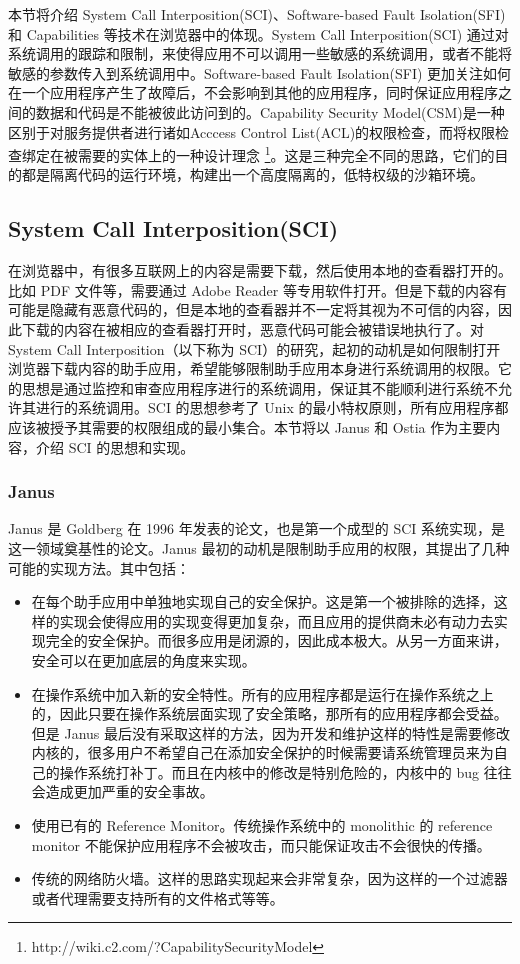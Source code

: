\documentclass[final,12pt]{elsarticle}
\begin{document}
本节将介绍 System Call Interposition(SCI)、Software-based Fault Isolation(SFI) 和 Capabilities 等技术在浏览器中的体现。System Call Interposition(SCI) 通过对系统调用的跟踪和限制，来使得应用不可以调用一些敏感的系统调用，或者不能将敏感的参数传入到系统调用中。Software-based Fault Isolation(SFI) 更加关注如何在一个应用程序产生了故障后，不会影响到其他的应用程序，同时保证应用程序之间的数据和代码是不能被彼此访问到的。Capability Security Model(CSM)是一种区别于对服务提供者进行诸如Acccess Control List(ACL)的权限检查，而将权限检查绑定在被需要的实体上的一种设计理念 \footnote{http://wiki.c2.com/?CapabilitySecurityModel}。这是三种完全不同的思路，它们的目的都是隔离代码的运行环境，构建出一个高度隔离的，低特权级的沙箱环境。

\subsection{System Call Interposition(SCI)}
\label{ss:sci}

在浏览器中，有很多互联网上的内容是需要下载，然后使用本地的查看器打开的。比如 PDF 文件等，需要通过 Adobe Reader 等专用软件打开。但是下载的内容有可能是隐藏有恶意代码的，但是本地的查看器并不一定将其视为不可信的内容，因此下载的内容在被相应的查看器打开时，恶意代码可能会被错误地执行了。对 System Call Interposition（以下称为 SCI）的研究，起初的动机是如何限制打开浏览器下载内容的助手应用，希望能够限制助手应用本身进行系统调用的权限。它的思想是通过监控和审查应用程序进行的系统调用，保证其不能顺利进行系统不允许其进行的系统调用。SCI 的思想参考了 Unix 的最小特权原则，所有应用程序都应该被授予其需要的权限组成的最小集合。本节将以 Janus 和 Ostia 作为主要内容，介绍 SCI 的思想和实现。

\subsubsection{Janus}
\label{sss:janus}

Janus \cite{goldberg} 是 Goldberg 在 1996 年发表的论文，也是第一个成型的 SCI 系统实现，是这一领域奠基性的论文。Janus 最初的动机是限制助手应用的权限，其提出了几种可能的实现方法。其中包括：

\begin{itemize}
\item
在每个助手应用中单独地实现自己的安全保护。这是第一个被排除的选择，这样的实现会使得应用的实现变得更加复杂，而且应用的提供商未必有动力去实现完全的安全保护。而很多应用是闭源的，因此成本极大。从另一方面来讲，安全可以在更加底层的角度来实现。
\item
在操作系统中加入新的安全特性。所有的应用程序都是运行在操作系统之上的，因此只要在操作系统层面实现了安全策略，那所有的应用程序都会受益。但是 Janus 最后没有采取这样的方法，因为开发和维护这样的特性是需要修改内核的，很多用户不希望自己在添加安全保护的时候需要请系统管理员来为自己的操作系统打补丁。而且在内核中的修改是特别危险的，内核中的 bug 往往会造成更加严重的安全事故。
\item
使用已有的 Reference Monitor。传统操作系统中的 monolithic 的 reference monitor 不能保护应用程序不会被攻击，而只能保证攻击不会很快的传播。
\item
传统的网络防火墙。这样的思路实现起来会非常复杂，因为这样的一个过滤器或者代理需要支持所有的文件格式等等。
\end{itemize}
\end{document}
